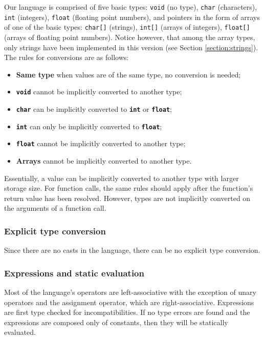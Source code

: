 Our language is comprised of five basic types:
\texttt{void} (no type), 
\texttt{char} (characters),
\texttt{int} (integers),
\texttt{float} (floating point numbers),
and pointers in the form of arrays of one of the basic types:
\texttt{char[]} (strings),
\texttt{int[]} (arrays of integers),
\texttt{float[]} (arrays of floating point numbers). Notice however, that among the array types,
only strings have been implemented in this version (see Section \ref{section:strings}).
The rules for conversions are as follows:

\begin{itemize}
 \item \textbf{Same type} when values are of the same type, no conversion is needed;
 \item \textbf{\texttt{void}} cannot be implicitly converted to another type;
 \item \textbf{\texttt{char}} can be implicitly converted to \textbf{\texttt{int}} or \textbf{\texttt{float}};
 \item \textbf{\texttt{int}} can only be implicitly converted to \textbf{\texttt{float}};
 \item \textbf{\texttt{float}} cannot be implicitly converted to another type;
 \item \textbf{Arrays} cannot be implicitly converted to another type.
\end{itemize}

Essentially, a value can be implicitly converted to another type with larger storage size.
For function calls, the same rules should apply after the function's return value has been
resolved. However, types are not implicitly converted on the arguments of a function call.

\subsubsection{Explicit type conversion}

Since there are no casts in the language, there can be no explicit type conversion.

\subsubsection{Expressions and static evaluation}

Most of the language's operators are left-associative with the exception of unary operators
and the assignment operator, which are right-associative. Expressions are first type checked
for incompatibilities. If no type errors are found and the expressions
are composed only of constants, then they will be statically evaluated.


